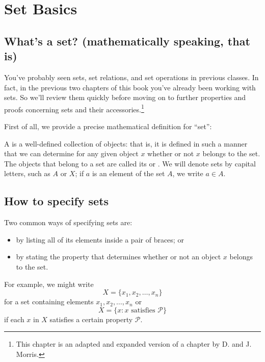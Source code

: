 


\section{Set Basics}
 
\subsection{What's a set? (mathematically speaking, that is)}
You've probably seen sets, set relations, and set operations in previous classes.  In fact, in the previous two chapters of this book you've already been working with sets.  So we'll review them quickly before moving on to further properties and proofs concerning sets and their accessories.\footnote{This chapter is an adapted and expanded version of a chapter by D. and J. Morris.}

First of all, we provide a precise mathematical definition for ``set'':

\begin{defn} A  is a well-defined collection of objects: that is, it is defined in such a manner that we can determine for any given object $x$ whether or not $x$ belongs to the set.  The objects that belong to a set are called its  or . We will denote sets by capital letters, such as $A$ or $X$; if $a$ is an element of the set $A$, we write $a \in A$\label{sets_membership}.
\end{defn}
\subsection{How to specify sets}
Two common ways of specifying sets are:
\begin{itemize}
\item
by listing all of its elements inside a pair of braces; or 
\item
by stating the property that determines whether or not an object $x$ belongs to the set. 
\end{itemize}
For example, we might write
\[
X = \{ x_1, x_2, \ldots, x_n \}
\]
for a set containing elements $x_1, x_2, \ldots, x_n$ or
\[
X = \{ x :x \text{ satisfies }{\mathcal P}\}
\]
if each $x$ in $X$ satisfies a certain property ${\mathcal P}$.  

